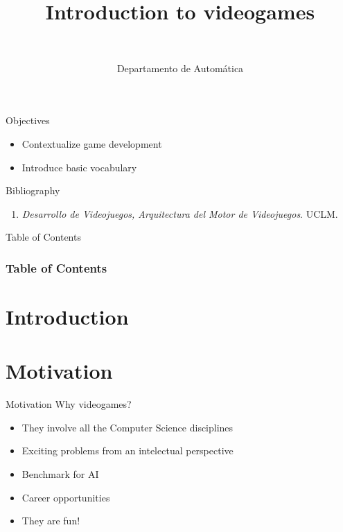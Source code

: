 \documentclass[10pt,compress]{beamer} %
\title[Introduction to videogames]{Introduction to videogames}
\author{\asignatura\\\carrera}
\institute{}
\date{Departamento de Automática}
\begin{document}
{\titlepageBlue
    \begin{frame}
        \titlepage
    \end{frame}
}

\institute{\asignatura}

\begin{frame}[plain]{}
   \begin{block}{Objectives}
   \begin{itemize}
   		\item Contextualize game development
		\item Introduce basic vocabulary
	\end{itemize}
	\end{block}

   \begin{block}{Bibliography}
      \begin{enumerate}
          \item  \textit{Desarrollo de Videojuegos, Arquitectura del Motor de Videojuegos}. UCLM.
      \end{enumerate} 
   \end{block}
\end{frame}


{
\begin{frame}[shrink]{Table of Contents}
 \frametitle{Table of Contents}
 \tableofcontents
\end{frame}
}

\section{Introduction}

\section[Motivation]{Motivation}
\begin{frame}{Motivation}
	Why videogames?
	\begin{itemize}
		\item They involve all the Computer Science disciplines
		\item Exciting problems from an intelectual perspective
		\item Benchmark for AI
		\item Career opportunities
		\item They are fun!
  	\end{itemize}
\end{frame}
\end{document}
